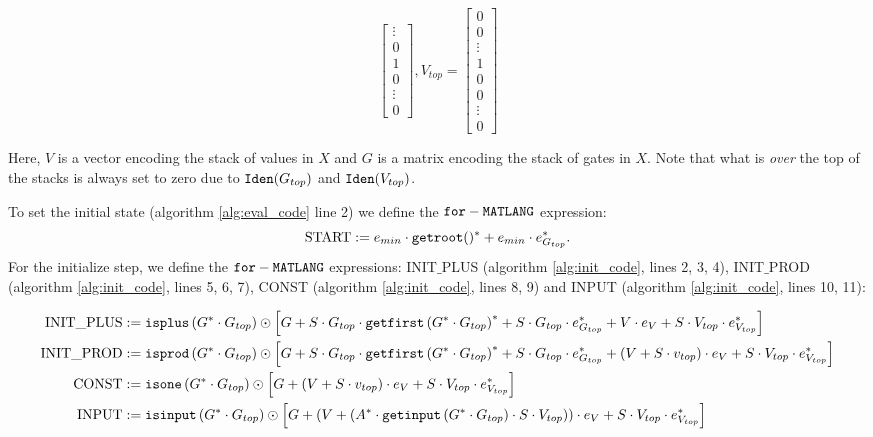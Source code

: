 \[\begin{bmatrix}
    \vdots   \\
    0 \\
    1 \\
    0 \\
    \vdots \\
     0 
\end{bmatrix}, 
V_{top} = \begin{bmatrix}
    0  \\
    0 \\
    \vdots   \\
    1 \\
    0 \\
    0 \\
    \vdots \\
     0 
\end{bmatrix}
\]

Here, $V$ is a vector encoding the stack of values in $X$ and $G$ is a matrix encoding the stack of gates in $X$. Note that what is \textit{over} the top of the stacks is always set to zero due to $\texttt{Iden}(G_{top})$ and $\texttt{Iden}(V_{top})$.

To set the initial state (algorithm \ref{alg:eval_code} line 2) we define the $\texttt{for}-\texttt{MATLANG}$ expression: $$\text{START}:= e_{min}\cdot \texttt{getroot}()^* + e_{min}\cdot e_{G_{top}}^*.$$
For the initialize step, we define the $\texttt{for}-\texttt{MATLANG}$ expressions: INIT${\_}$PLUS (algorithm \ref{alg:init_code}, lines 2, 3, 4), INIT${\_}$PROD (algorithm \ref{alg:init_code}, lines 5, 6, 7), CONST (algorithm \ref{alg:init_code}, lines 8, 9) and INPUT (algorithm \ref{alg:init_code}, lines 10, 11):

\begin{align*}
	\text{INIT{\_}PLUS} &:= \texttt{isplus}\left( G^*\cdot G_{top} \right)\odot \left[ G + S\cdot G_{top} \cdot \texttt{getfirst}\left(G^*\cdot G_{top} \right)^*  + S\cdot G_{top}\cdot e_{G_{top}}^* +V\cdot e_{V} + S\cdot V_{top}\cdot e_{V_{top}}^* \right] \\
	\text{INIT{\_}PROD} &:= \texttt{isprod}\left(G^*\cdot G_{top} \right)\odot \left[ G + S\cdot G_{top} \cdot \texttt{getfirst}\left(G^*\cdot G_{top} \right)^* + S\cdot G_{top}\cdot e_{G_{top}}^* +(V + S\cdot v_{top})\cdot e_{V} + S\cdot V_{top}\cdot e_{V_{top}}^* \right] \\
	\text{CONST} &:= \texttt{isone}\left(G^*\cdot G_{top} \right)\odot \left[ G + (V + S\cdot v_{top})\cdot e_{V} + S\cdot V_{top}\cdot e_{V_{top}}^* \right] \\
	\text{INPUT} &:= \texttt{isinput}\left(G^*\cdot G_{top} \right)\odot \left[ G + \left(V + \left( A^* \cdot \texttt{getinput}\left(G^*\cdot G_{top} \right) \cdot S\cdot V_{top} \right)\right)\cdot e_{V} + S\cdot V_{top}\cdot e_{V_{top}}^* \right]
\end{align*} 

